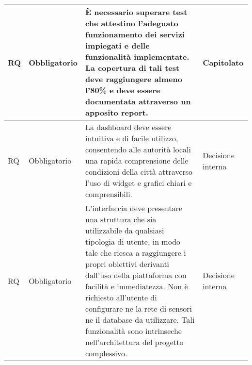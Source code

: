 \begin{longtable}{|C{1cm}|C{2cm}|>{\raggedright}m{5cm}|C{2cm}|}
    \hline
     RQ & Obbligatorio &  È necessario superare test che attestino l'adeguato funzionamento dei servizi impiegati e delle funzionalità implementate. La copertura di tali test deve raggiungere almeno l'80\% e deve essere documentata attraverso un apposito report. & Capitolato \\
    \hline
     RQ & Obbligatorio &  La dashboard deve essere intuitiva e di facile utilizzo, consentendo alle autorità locali una rapida comprensione delle condizioni della città attraverso l'uso di widget e grafici chiari e comprensibili.  & Decisione interna \\
    \hline
     RQ & Obbligatorio & L’interfaccia deve presentare una struttura che sia utilizzabile da qualsiasi tipologia di utente, in modo tale che riesca a raggiungere i propri obiettivi derivanti dall’uso della piattaforma con facilità e immediatezza. Non è richiesto all’utente di configurare ne la rete di sensori ne il database da utilizzare. Tali funzionalità sono intrinseche nell’architettura del progetto complessivo. & Decisione interna \\
    \hline
   
\end{longtable}